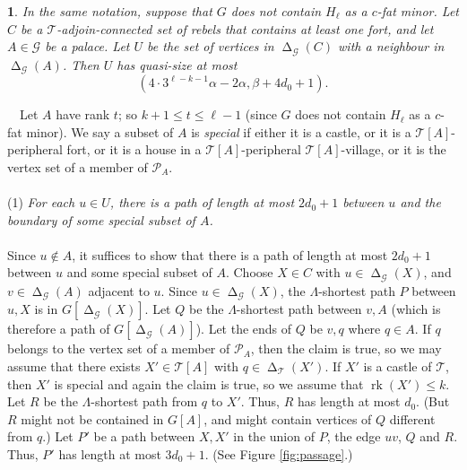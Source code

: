 \documentclass[titlepage,11pt]{article}
\newcommand{\dist}{\operatorname{dist}}
\newcommand{\voro}{\operatorname{\Delta}}
\newcommand{\rk}{\operatorname{rk}}
\newcommand{\mac}{\mathcal}
\newtheorem{thm}{}[section]
\newcommand{\Proof}{\noindent{\bf Proof.}\ \ }
\begin{document}
	\begin{thm}\label{palacebound}
		In the same notation, suppose that $G$ does not contain $H_\ell$ as a $c$-fat minor. Let $C$ be a $\mac T$-adjoin-connected set of rebels that contains at least
		one fort, and let $A\in \mac G$ be a palace.
		Let $U$ be the set of vertices in $\voro_{\mac G}(C)$ with a neighbour in  $\voro_{\mac G}(A)$.
		Then $U$ has quasi-size at most
		$$\left(4\cdot 3^{\ell-k-1}\alpha-2\alpha, \beta+4d_0+1\right).$$
	\end{thm}
	\Proof Let $A$ have rank $t$; so $k+1\le t\le \ell-1$ (since $G$ does not contain $H_\ell$ as a $c$-fat minor). 
	We say a subset of $A$ is {\em special} if either it is a castle, or it is a $\mac T[A]$-peripheral fort, or it is a house in 
	a $\mac T[A]$-peripheral $\mac T[A]$-village, or it is the vertex set of a member of $\mac P_A$.
	\\
	\\
	(1) {\em For each $u\in U$, 
		there is a path of length at most $2d_0+1$ between $u$ and the boundary of some special subset of $A$.}
	\\
	\\
	Since $u\notin A$, it suffices to show that there is a path of length at most $2d_0+1$ between $u$ and some special subset of $A$.
	Choose $X\in C$ with  $u\in \voro_{\mac G}(X)$, and $v \in \voro_{\mac G}(A)$ adjacent to $u$.
	Since $u\in \voro_{\mac G}(X)$, the $\Lambda$-shortest path $P$ between $u,X$ is in $G[\voro_{\mac G}(X)]$. 
	Let $Q$ be the $\Lambda$-shortest path between $v,A$ (which is therefore a path of $G[\voro_{\mac G}(A)]$). 
	Let the ends of $Q$ be $v,q$ where $q\in A$. If $q$ belongs to the vertex set of a member of $\mac P_A$, then
	the claim is true, so we may assume that there exists 
	$X'\in \mac T[A]$ with $q\in \voro_{\mac T}(X')$.
	If $X'$ is a castle of $\mac T$, then $X'$ is special and again the claim is true, so we assume that $\rk(X')\le k$.
	Let $R$ be the $\Lambda$-shortest path from $q$ to $X'$. Thus,
	$R$ has length 
	at most $d_0$. (But $R$ might not be contained in $G[A]$, and might contain vertices of $Q$ different from $q$.)
	Let $P'$ be a path between $X,X'$ in the union of $P$, the edge 
	$uv$, $Q$ and $R$. Thus, $P'$ has length at most $3d_0+1$.
	(See Figure \ref{fig:passage}.)
\end{document}
